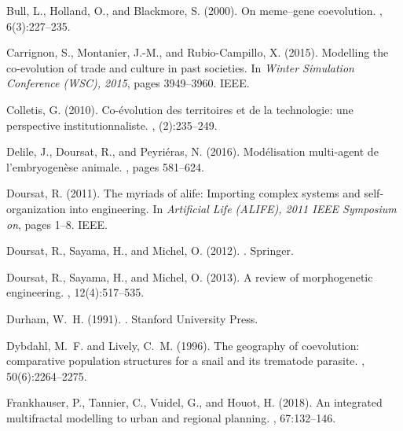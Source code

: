 \documentclass[letterpaper]{article}
\begin{document}
\begin{thebibliography}{}
Bull, L., Holland, O., and Blackmore, S. (2000).
\newblock On meme--gene coevolution.
, 6(3):227--235.

Carrignon, S., Montanier, J.-M., and Rubio-Campillo, X. (2015).
\newblock Modelling the co-evolution of trade and culture in past societies.
\newblock In {\em Winter Simulation Conference (WSC), 2015}, pages 3949--3960.
  IEEE.

Colletis, G. (2010).
\newblock Co-{\'e}volution des territoires et de la technologie: une
  perspective institutionnaliste.
, (2):235--249.

Delile, J., Doursat, R., and Peyri{\'e}ras, N. (2016).
\newblock Mod{\'e}lisation multi-agent de l'embryogen{\`e}se animale.
, pages
  581--624.

Doursat, R. (2011).
\newblock The myriads of alife: Importing complex systems and self-organization
  into engineering.
\newblock In {\em Artificial Life (ALIFE), 2011 IEEE Symposium on}, pages 1--8.
  IEEE.

Doursat, R., Sayama, H., and Michel, O. (2012).
.
\newblock Springer.

Doursat, R., Sayama, H., and Michel, O. (2013).
\newblock A review of morphogenetic engineering.
, 12(4):517--535.

Durham, W.~H. (1991).
.
\newblock Stanford University Press.

Dybdahl, M.~F. and Lively, C.~M. (1996).
\newblock The geography of coevolution: comparative population structures for a
  snail and its trematode parasite.
, 50(6):2264--2275.

Frankhauser, P., Tannier, C., Vuidel, G., and Houot, H. (2018).
\newblock An integrated multifractal modelling to urban and regional planning.
, 67:132--146.


\end{thebibliography}
\end{document}
